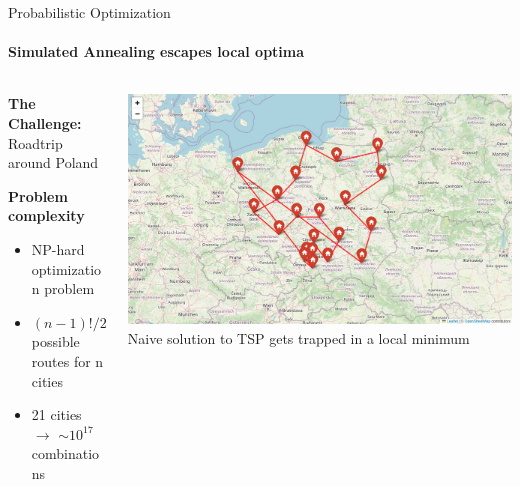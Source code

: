 \documentclass{beamer}
\begin{document}
\begin{frame}{Probabilistic Optimization}
  \framesubtitle{Simulated Annealing escapes local optima}
  \begin{columns}[c]
    \begin{column}{0.4\textwidth}
      \textbf{The Challenge:} Roadtrip around Poland
      \vspace{0.5cm}

      \textbf{Problem complexity}
      \begin{itemize}
        \item NP-hard optimization problem
        \item $(n-1)!/2$ possible routes for n cities
        \item 21 cities $\to$ $\sim10^{17}$ combinations
      \end{itemize}
    \end{column}
    \begin{column}{0.6\textwidth}
      \begin{center}
        \includegraphics[width=\textwidth]{images/tsp-naive.png}
        \\[0.2cm]
        \small{Naive solution to TSP gets trapped in a local minimum}
      \end{center}
    \end{column}
  \end{columns}
\end{frame}
\end{document}
